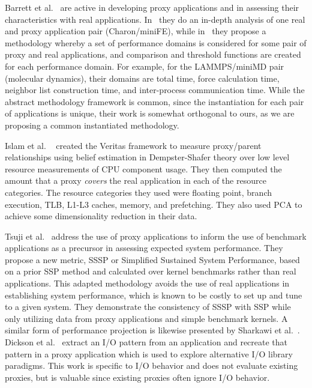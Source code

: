 Barrett et al.~\cite{BARRETT2015107,CPE:CPE3587} are active in developing proxy applications and in assessing their characteristics with real applications. In~\cite{CPE:CPE3587} they do an in-depth analysis of one real and proxy application pair (Charon/miniFE), while in~\cite{BARRETT2015107} they propose a methodology whereby a set of performance domains is considered for some pair of proxy and real applications, and comparison and threshold functions are created for each performance domain.  For example, for the LAMMPS/miniMD pair (molecular dynamics), their domains are total time, force calculation time, neighbor list construction time, and inter-process communication time. While the abstract methodology framework is common, since the instantiation for each pair of applications is unique, their work is somewhat orthogonal to ours, as we are proposing a common instantiated methodology.

Islam et al. ~\cite{Islam:2016:MLF:3014904.3014966} created the Veritas framework to measure proxy/parent relationships using belief estimation in Dempster-Shafer theory over low level resource measurements of CPU component usage. They then computed the amount that a proxy \emph{covers} the real application in each of the resource categories. The resource categories they used were floating point, branch execution, TLB, L1-L3 caches, memory, and prefetching. They also used PCA to achieve some dimensionality reduction in their data.

Tsuji et al.~\cite{8049025} address the use of proxy applications to inform the use of benchmark applications as a precursor in assessing expected system performance. They propose a new metric, SSSP or Simplified Sustained System Performance, based on a prior SSP method and calculated over kernel benchmarks rather than real applications. This adapted methodology avoids the use of real applications in establishing system performance, which is known to be costly to set up and tune to a given system. They demonstrate the consistency of SSSP with SSP while only utilizing data from proxy applications and simple benchmark kernels. A similar form of performance projection is likewise presented by Sharkawi et al.~\cite{sharkawi2009performance}. Dickson et al.~\cite{7836562} extract an I/O pattern from an application and recreate that pattern in a proxy application which is used to explore alternative I/O library paradigms. This work is specific to I/O behavior and does not evaluate existing proxies, but is valuable since existing proxies often ignore I/O behavior.

